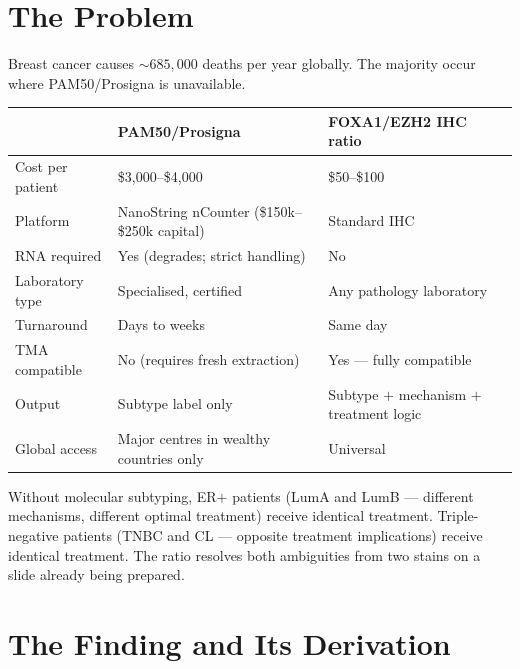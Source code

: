 \documentclass[11pt, a4paper]{article}
\begin{document}
\vspace{0.8em}

\section{The Problem}

Breast cancer causes ${\sim}685{,}000$ deaths
per year globally. The majority occur where
PAM50/Prosigna is unavailable.

\begin{center}
\begin{tabular}{p{4.2cm}p{4.5cm}p{4.5cm}}
\toprule
& \textbf{PAM50/Prosigna} &
\textbf{FOXA1/EZH2 IHC ratio} \\
\midrule
Cost per patient &
\$3,000--\$4,000 &
\$50--\$100 \\
Platform &
NanoString nCounter
(\$150k--\$250k capital) &
Standard IHC \\
RNA required &
Yes (degrades; strict handling) &
No \\
Laboratory type &
Specialised, certified &
Any pathology laboratory \\
Turnaround &
Days to weeks &
Same day \\
TMA compatible &
No (requires fresh extraction) &
Yes --- fully compatible \\
Output &
Subtype label only &
Subtype $+$ mechanism $+$
treatment logic \\
Global access &
Major centres in
wealthy countries only &
Universal \\
\bottomrule
\end{tabular}
\end{center}

Without molecular subtyping, ER$+$ patients
(LumA and LumB --- different mechanisms,
different optimal treatment) receive identical
treatment. Triple-negative patients (TNBC and
CL --- opposite treatment implications) receive
identical treatment. The ratio resolves both
ambiguities from two stains on a slide already
being prepared.

\section{The Finding and Its Derivation}
\end{document}
